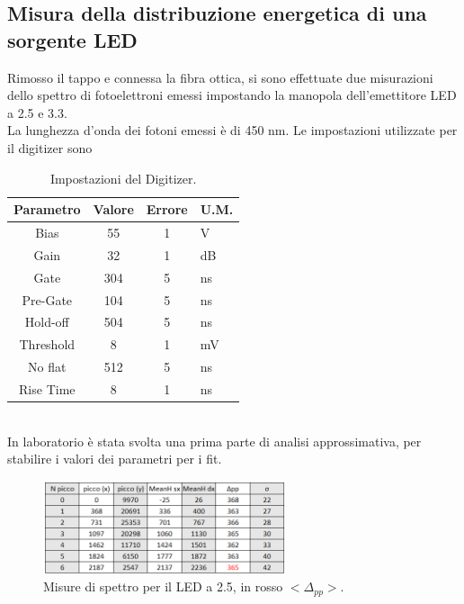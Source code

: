 \documentclass[11pt]{article} %
\begin{document}
\subsection{Misura della distribuzione energetica di una sorgente LED}
Rimosso il tappo e connessa la fibra ottica, si sono effettuate due misurazioni dello spettro di fotoelettroni emessi impostando la manopola dell'emettitore LED a 2.5 e 3.3.\\La lunghezza d'onda dei fotoni emessi è di 450 nm.
Le impostazioni utilizzate per il digitizer sono
\begin{table}[!h]
\begin{center}
\begin{tabular}{|c|c|c|l|}
\hline
\multicolumn{1}{|l|}{Parametro} & \multicolumn{1}{l|}{Valore} & \multicolumn{1}{l|}{Errore} & U.M. \\ \hline
Bias                               &55                       & 1                       & V\\ \hline
Gain                               & 32                       & 1                          & dB   \\ \hline
Gate                               & 304                       & 5                       & ns \\ \hline
Pre-Gate                               & 104                     & 5                        & ns   \\ \hline
Hold-off                               & 504                     & 5                         & ns \\ \hline
Threshold                               & 8                      & 1                          & mV   \\ \hline
No flat                               & 512                       & 5                         & ns   \\ \hline
Rise Time                               & 8                       & 1                          & ns  \\ \hline
\end{tabular}
\end{center}
\caption{Impostazioni del Digitizer.}
\end{table}
\\
In laboratorio è stata svolta una prima parte di analisi approssimativa, per stabilire i valori dei parametri per i fit.
\begin{figure}[h!]
\begin{center}
\includegraphics[width=270px]{img/tab25.png}
\caption{Misure di spettro per il LED a 2.5, in rosso $<\!\!\Delta_{pp}\!\!>$.}
\label{fig:Sipm25}
\end{center}
\end{figure}
\end{document}
